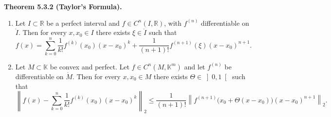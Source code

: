 \documentclass[12pt]{article}
\newenvironment{satz}[1]{%
  \par\vspace{6pt}\noindent\textbf{Theorem #1.}\itshape\space
}{%
  \par\vspace{6pt}
}
\begin{document}

\begin{satz}{5.3.2 (Taylor's Formula)}
\begin{enumerate}
    \item Let $I \subset \mathbb{R}$ be a perfect interval and $f \in C^n(I,\mathbb{R})$, with $f^{(n)}$ differentiable on $\mathring I$. Then for every $x,x_0\in I$ there exists $\xi\in\mathring I$ such that
    \[
        f(x)=\sum_{k=0}^{n}\frac{1}{k!}f^{(k)}(x_0)(x-x_0)^k
        +\frac{1}{(n+1)!}f^{(n+1)}(\xi)(x-x_0)^{n+1}.
    \]

    \item Let $M\subset\mathbb K$ be convex and perfect. Let $f\in C^n(M,\mathbb K^m)$ and let $f^{(n)}$ be differentiable on $\mathring M$. Then for every $x,x_0\in M$ there exists $\Theta\in\left]0,1\right[$ such that
    \[
        \left\|f(x)-\sum_{k=0}^{n}\frac{1}{k!}f^{(k)}(x_0)(x-x_0)^k\right\|_2
        \le
        \frac{1}{(n+1)!}\left\|f^{(n+1)}\!\big(x_0+\Theta(x-x_0)\big)(x-x_0)^{n+1}\right\|_2.
    \]
\end{enumerate}
\end{satz}
\end{document}

